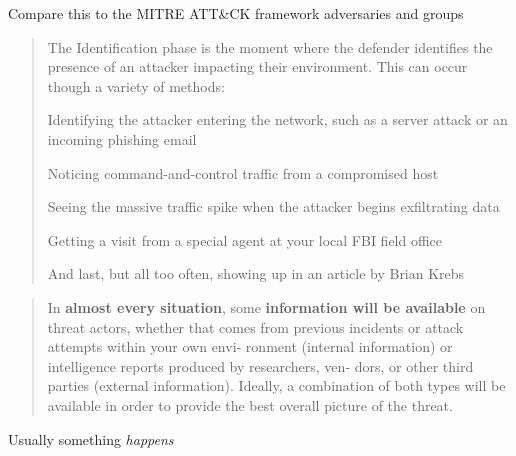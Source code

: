 \documentclass[Screen16to9,17pt]{foils}
\begin{document}
\begin{list2}
\item Compare this to the MITRE ATT\&CK framework adversaries and groups\\
\end{list2}





\begin{quote}
The Identification phase is the moment where the defender identifies the presence of
an attacker impacting their environment. This can occur though a variety of methods:
\begin{list2}
\item Identifying the attacker entering the network, such as a server attack or an
incoming phishing email
\item  Noticing command-and-control traffic from a compromised host
\item  Seeing the massive traffic spike when the attacker begins exfiltrating data
\item  Getting a visit from a special agent at your local FBI field office
\item  And last, but all too often, showing up in an article by Brian Krebs
\end{list2}
\end{quote}



\begin{quote}
In {\bf almost every situation}, some {\bf information will be available} on threat actors,
whether that comes from previous incidents or attack attempts within your own envi‐
ronment (internal information) or intelligence reports produced by researchers, ven‐
dors, or other third parties (external information). Ideally, a combination of both
types will be available in order to provide the best overall picture of the threat.
\end{quote}

\begin{list2}
\item Usually something \emph{happens}
\end{list2}


\end{document}
